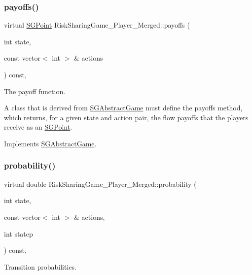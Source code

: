 \subsubsection{\texorpdfstring{payoffs()}{payoffs()}}
{\footnotesize\ttfamily virtual \hyperlink{classSGPoint}{S\+G\+Point} Risk\+Sharing\+Game\+\_\+Player\+\_\+\+Merged\+::payoffs (\begin{DoxyParamCaption}\item[{int}]{state,  }\item[{const vector$<$ int $>$ \&}]{actions }\end{DoxyParamCaption}) const\hspace{0.3cm}{\ttfamily [inline]}, {\ttfamily [virtual]}}



The payoff function. 

A class that is derived from \hyperlink{classSGAbstractGame}{S\+G\+Abstract\+Game} must define the payoffs method, which returns, for a given state and action pair, the flow payoffs that the players receive as an \hyperlink{classSGPoint}{S\+G\+Point}. 

Implements \hyperlink{classSGAbstractGame_a3fc1cd009d1813f44f1f219e7deb6eef}{S\+G\+Abstract\+Game}.

\mbox{\label{classRiskSharingGame__3Player__Merged_a505d06e31a1cabde1c6fab8ac5af8409}} 
\subsubsection{\texorpdfstring{probability()}{probability()}}
{\footnotesize\ttfamily virtual double Risk\+Sharing\+Game\+\_\+Player\+\_\+\+Merged\+::probability (\begin{DoxyParamCaption}\item[{int}]{state,  }\item[{const vector$<$ int $>$ \&}]{actions,  }\item[{int}]{statep }\end{DoxyParamCaption}) const\hspace{0.3cm}{\ttfamily [inline]}, {\ttfamily [virtual]}}



Transition probabilities. 


